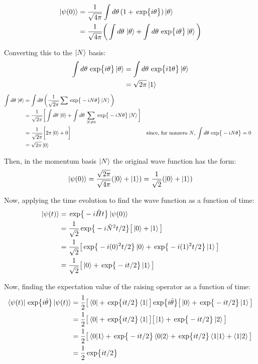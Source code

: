 \documentclass{article}
\newcommand{\D}[1]{{d#1 \,}}
\renewcommand{\exp}[1]{\,\text{exp} \big\{ #1 \big\} }
\begin{document}
\begin{align*}
    \ket{\psi(0)}
    &= \frac{1}{\sqrt{4\pi}} \int \D{\theta} (1 + \exp{i\theta}) \ket{\theta} \\
    &= \frac{1}{\sqrt{4\pi}} \bigg( \int \D{\theta} \ket{\theta} + \int \D{\theta} \exp{i\theta} \ket{\theta} \bigg)
\end{align*}

Converting this to the $\ket{N}$ basis:
\begin{align*}
   \int \D{\theta} \exp{i\theta} \ket{\theta}
    &= \int \D{\theta} \exp{i1\theta} \ket{\theta} \\
    &=  \sqrt{2\pi}\ket{1} \\
\end{align*}
\begin{align*}
    \int \D{\theta} \ket{\theta}
    &= \int \D{\theta} \bigg( \frac{1}{\sqrt{2\pi}} \sum \exp{-iN\theta}\ket{N} \bigg) \\
    &= \frac{1}{\sqrt{2\pi}} \bigg[ \int \D{\theta} \ket{0} + \int \D{\theta} \sum_{N\neq0} \exp{-iN\theta}\ket{N} \bigg] \\
    &= \frac{1}{\sqrt{2\pi}} \bigg[ 2\pi \ket{0} + 0 \bigg]
        && \text{since, for nonzero $N$, $\int \D{\theta}\exp{-iN\theta} = 0$} \\
    &= \sqrt{2\pi}\ket{0}
\end{align*}

Then, in the momentum basis $\ket{N}$ the original wave function has the form:
\[ \ket{\psi(0)} = \frac{\sqrt{2\pi}}{\sqrt{4\pi}} ( \ket{0} + \ket{1} ) = \frac{1}{\sqrt{2}}(\ket{0} + \ket{1} ) \]

Now, applying the time evolution to find the wave function as a function of time:
\begin{align*}
    \ket{\psi(t)}
    &= \exp{-i\hat{H}t}\ket{\psi(0)} \\
    &= \frac{1}{\sqrt{2}} \exp{-i\hat{N}^2t/2}\big[ \ket{0} + \ket{1} \big] \\
    &= \frac{1}{\sqrt{2}} \big[ \exp{-i(0)^2t/2} \ket{0} + \exp{-i(1)^2t/2} \ket{1} \big] \\
    &= \frac{1}{\sqrt{2}} \big[ \ket{0} + \exp{-it/2} \ket{1} \big]
\end{align*}

Now, finding the expectation value of the raising operator as a function of time:
\begin{align*}
    \bra{\psi(t)} \exp{i\hat{\theta}} \ket{\psi(t)}
    &= \frac{1}{2} \big[ \bra{0} + \exp{it/2} \bra{1} \big]
        \exp{i\hat{\theta}}
        \big[ \ket{0} + \exp{-it/2} \ket{1} \big] \\
    &= \frac{1}{2} \big[ \bra{0} + \exp{it/2} \bra{1} \big]
        \big[ \ket{1} + \exp{-it/2} \ket{2} \big] \\
    &= \frac{1}{2} \big[
        \braket{0|1}
        + \exp{-it/2} \braket{0|2}
        + \exp{it/2} \braket{1|1}
        + \braket{1|2}
        \big] \\
    &= \frac{1}{2} \exp{it/2}
\end{align*}
\end{document}
